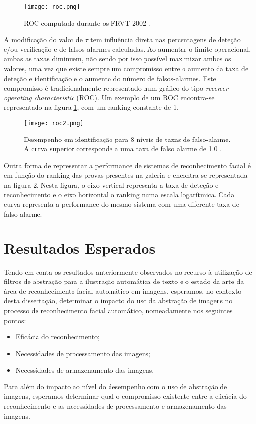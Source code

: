 \begin{figure}[ht]
  \begin{center}
    \leavevmode
    \texttt{[image: roc.png]}
    \caption{ROC computado durante os FRVT 2002 \cite{Li2011}.}	
    \label{fig:roc}
  \end{center}
\end{figure}
A modificação do valor de $\tau$ tem influência direta nas percentagens de deteção e/ou verificação e de falsos-alarmes calculadas. Ao aumentar o limite operacional, ambas as taxas diminuem, não sendo por isso possível maximizar ambos os valores, uma vez que existe sempre um compromisso entre o aumento da taxa de deteção e identificação e o aumento do número de falsos-alarmes. Este compromisso é tradicionalmente representado num gráfico do tipo \textit{receiver operating characteristic} (ROC). Um exemplo de um ROC encontra-se representado na figura \ref{fig:roc}, com um ranking constante de 1. 

\begin{figure}[ht]
  \begin{center}
    \leavevmode
    \texttt{[image: roc2.png]}
    \caption{Desempenho em identificação para 8 níveis de taxas de falso-alarme. A curva superior corresponde a uma taxa de falso alarme de 1.0 \cite{Li2011}.}	
    \label{fig:roc2}
  \end{center}
\end{figure}
Outra forma de representar a performance de sistemas de reconhecimento facial é em função do ranking das provas presentes na galeria e encontra-se representada na figura \ref{fig:roc2}. Nesta figura, o eixo vertical representa a taxa de deteção e reconhecimento e o eixo horizontal o ranking numa escala logarítmica. Cada curva representa a performance do mesmo sistema com uma diferente taxa de falso-alarme.

\section{Resultados Esperados}
Tendo em conta os resultados anteriormente observados no recurso à utilização de filtros de abstração para a ilustração automática de texto e o estado da arte da área de reconhecimento facial automático em imagens, esperamos, no contexto desta dissertação, determinar o impacto do uso da abstração de imagens no processo de reconhecimento facial automático, nomeadamente nos seguintes pontos:
\begin{itemize}
\item Eficácia do reconhecimento;
\item Necessidades de processamento das imagens;
\item Necessidades de armazenamento das imagens.
\end{itemize}
Para além do impacto ao nível do desempenho com o uso de abstração de imagens, esperamos determinar qual o compromisso existente entre a eficácia do reconhecimento e as necessidades de processamento e armazenamento das imagens.

